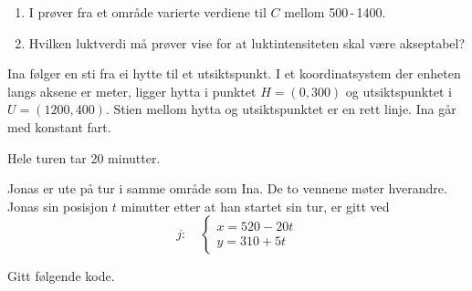 \begin{enumerate}
	\item I prøver fra et område varierte verdiene til $C$ mellom 500\,-\,1400.
	\item[b)] Hvilken luktverdi må prøver vise for at luktintensiteten skal være akseptabel?
\end{enumerate}

Ina følger en sti fra ei hytte til et utsiktspunkt. I et koordinatsystem der
enheten langs aksene er meter, ligger hytta i punktet ${H=(0, 300)}$ og
utsiktspunktet i ${U=(1200, 400)}$. Stien mellom hytta og utsiktspunktet er en
rett linje. Ina går med konstant fart.


Hele turen tar 20 minutter.


Jonas er ute på tur i samme område som Ina. De to vennene møter hverandre.
Jonas sin posisjon $t$ minutter etter at han startet sin tur, er gitt ved
\[
j:\quad
\begin{cases}
	x = 520 - 20t \\
	y = 310 + 5t
\end{cases}
\]

\newpage
{}
Gitt følgende kode.

